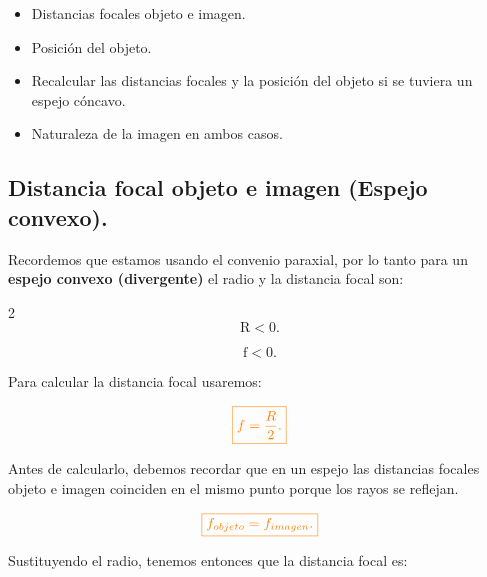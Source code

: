 \documentclass[a4paper,12pt]{article} %
\begin{document}
\begin{itemize}
	\item Distancias focales objeto e imagen.
	\item Posición del objeto.
	\item Recalcular las distancias focales y la posición del objeto si se tuviera un espejo cóncavo. 
	\item Naturaleza de la imagen en ambos casos.
\end{itemize}

\vspace{\baselineskip}

\subsection{Distancia focal objeto e imagen (Espejo convexo).}

\begin{justify}
	Recordemos que estamos usando el convenio paraxial, por lo tanto para un \textbf{espejo convexo (divergente)} el radio y la distancia focal son:
\end{justify}

\begin{multicols}{2}
	\[\mathrm{R < 0}.\]
	
	\[\mathrm{f < 0}.\]
\end{multicols}

\vspace{\baselineskip}

\begin{justify}
	Para calcular la distancia focal usaremos:
\end{justify}

\[ \textcolor{orange}{\boxed{f = \frac{R}{2}.}} \]

\vspace{\baselineskip}

\begin{justify}
	Antes de calcularlo, debemos recordar que en un espejo las distancias focales objeto e imagen coinciden en el mismo punto porque los rayos se reflejan.
\end{justify}

\vspace{\baselineskip}

\[ \textcolor{orange}{ \boxed{f_{objeto} = f_{imagen}.}} \]

\vspace{\baselineskip}

\begin{justify}
	Sustituyendo el radio, tenemos entonces que la distancia focal es:
\end{justify}
\end{document}
